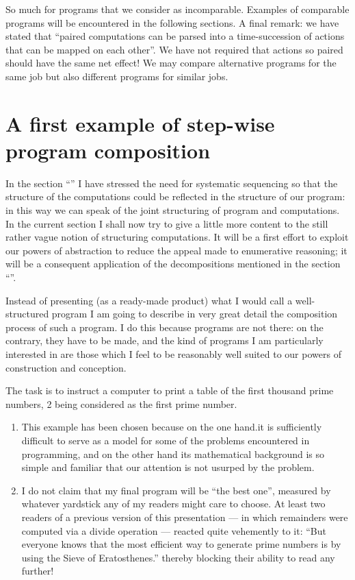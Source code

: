 So much for programs that we consider as incomparable. Examples of comparable programs will be encountered in the following sections. A final remark: we have stated that ``paired computations can be parsed into a time-succession of actions that can be mapped on each other''. We have not required that actions so paired should have the same net effect! We may compare alternative programs for the same job but also different programs for similar jobs.

\section{A first example of step-wise program composition}
\label{sec:first-example-step-wise-program-composition}

In the section ``'' I have stressed the need for systematic sequencing so that the structure of the computations could be reflected in the structure of our program: in this way we can speak of the joint structuring of program and computations. In the current section I shall now try to give a little more content to the still rather vague notion of structuring computations. It will be a first effort to exploit our powers of abstraction to reduce the appeal made to enumerative reasoning; it will be a consequent application of the decompositions mentioned in the section ``''.

Instead of presenting (as a ready-made product) what I would call a well-structured program I am going to describe in very great detail the composition process of such a program. I do this because programs are not there: on the contrary, they have to be made, and the kind of programs I am particularly interested in are those which I feel to be reasonably well suited to our powers of construction and conception.

The task is to instruct a computer to print a table of the first thousand prime numbers, 2 being considered as the first prime number.

\begin{enumerate}[leftmargin=*, itemindent=2.2\parindent, label=\textit{Note }\arabic*.]
	\item This example has been chosen because on the one hand.it is sufficiently difficult to serve as a model for some of the problems encountered in programming, and on the other hand its mathematical background is so simple and familiar that our attention is not usurped by the problem.
	
	\item I do not claim that my final program will be ``the best one'', measured by whatever yardstick any of my readers might care to choose. At least two readers of a previous version of this presentation --- in which remainders were computed via a divide operation --- reacted quite vehemently to it: ``But everyone knows that the most efficient way to generate prime numbers is by using the Sieve of Eratosthenes.'' thereby blocking their ability to read any further!
\end{enumerate}

